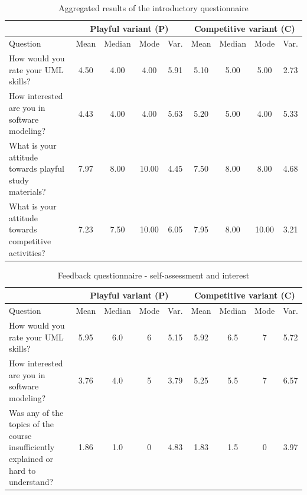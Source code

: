 \FloatBarrier
\begin{table}[h]
\centering
\small
\renewcommand{\arraystretch}{1.2}
\begin{tabular}{>{\raggedright\arraybackslash}p{4cm}|cccc|cccc}
\hline
 & \multicolumn{4}{c|}{Playful variant (P)} & \multicolumn{4}{c}{Competitive variant (C)} \\
\hline
Question & Mean & Median & Mode & Var. & Mean & Median & Mode & Var. \\
\hline

How would you rate your UML skills? 
& 4.50 & 4.00 & 4.00 & 5.91 & 5.10 & 5.00 & 5.00 & 2.73 \\

How interested are you in software modeling? 
& 4.43 & 4.00 & 4.00 & 5.63 & 5.20 & 5.00 & 4.00 & 5.33 \\

What is your attitude towards playful study materials? 
& 7.97 & 8.00 & 10.00 & 4.45 & 7.50 & 8.00 & 8.00 & 4.68 \\

What is your attitude towards competitive activities? 
& 7.23 & 7.50 & 10.00 & 6.05 & 7.95 & 8.00 & 10.00 & 3.21 \\

\hline
\end{tabular}
\caption{Aggregated results of the introductory questionnaire}
\end{table}

\FloatBarrier


\FloatBarrier

\begin{table}[h]
\centering
\small
\renewcommand{\arraystretch}{1.2}
\begin{tabular}{>{\raggedright\arraybackslash}p{4cm}|cccc|cccc}
\hline
 & \multicolumn{4}{c|}{Playful variant (P)} & \multicolumn{4}{c}{Competitive variant (C)} \\
\hline
Question & Mean & Median & Mode & Var. & Mean & Median & Mode & Var. \\
\hline

How would you rate your UML skills? 
& 5.95 & 6.0 & 6 & 5.15 & 5.92 & 6.5 & 7 & 5.72 \\

How interested are you in software modeling? 
& 3.76 & 4.0 & 5 & 3.79 & 5.25 & 5.5 & 7 & 6.57 \\

Was any of the topics of the course insufficiently explained or hard to understand? 
& 1.86 & 1.0 & 0 & 4.83 & 1.83 & 1.5 & 0 & 3.97 \\

\hline
\end{tabular}
\caption{Feedback questionnaire - self-assessment and interest}
\end{table}
\FloatBarrier



